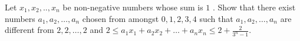 Let $ x_1,x_2,..,x_n$  be non-negative numbers whose sum is $ 1$  . Show that there exist numbers $ a_1,a_2,\ldots ,a_n$ chosen from amongst $ 0,1,2,3,4$  such that $ a_1,a_2,\ldots ,a_n$ are different from $ 2,2,\ldots ,2$  and $ 2\leq a_1x_1+a_2x_2+\ldots+a_nx_n\leq 2+\frac{2}{3^n-1}$.